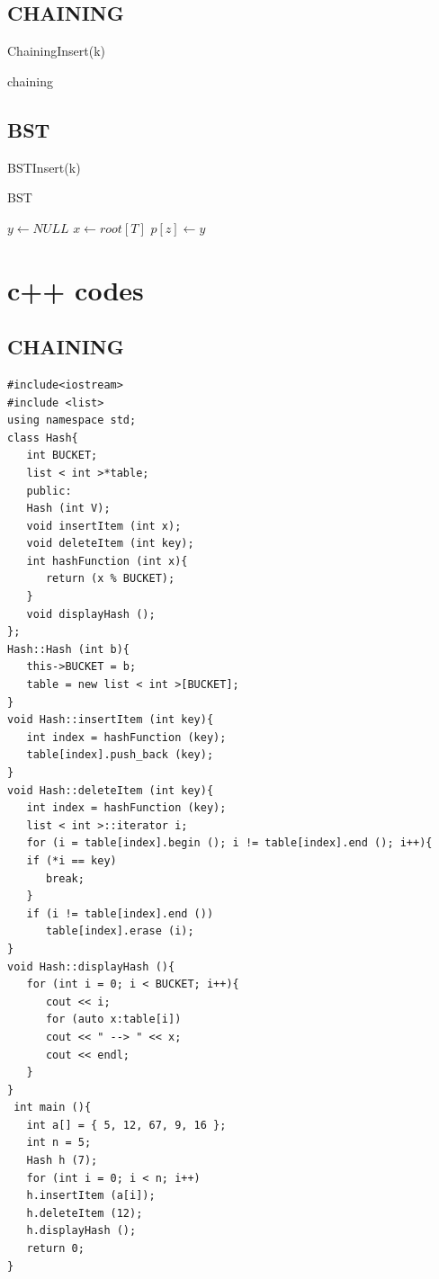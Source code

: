 \documentclass{report}
\begin{document}
\subsection{\textbf{\large CHAINING}}
\begin{algorithm}
ChainingInsert(k)\;
\caption{chaining}\label{alg:two}
\end{algorithm}
\newpage
\subsection{\textbf{\large BST}}
\begin{algorithm}
BSTInsert(k)\;
\caption{BST}\label{alg:three}
$y \gets NULL$\;
$x \gets root[T]$\;
$p[z] \gets y$\;
\end{algorithm}
\newpage
\section{c++ codes}
\subsection{\textbf{\large CHAINING}}
\begin{verbatim}
#include<iostream>
#include <list>
using namespace std;
class Hash{
   int BUCKET;
   list < int >*table;
   public:
   Hash (int V);
   void insertItem (int x);
   void deleteItem (int key);
   int hashFunction (int x){
      return (x % BUCKET);
   }
   void displayHash ();
};
Hash::Hash (int b){
   this->BUCKET = b;
   table = new list < int >[BUCKET];
}
void Hash::insertItem (int key){
   int index = hashFunction (key);
   table[index].push_back (key);
}
void Hash::deleteItem (int key){
   int index = hashFunction (key);
   list < int >::iterator i;
   for (i = table[index].begin (); i != table[index].end (); i++){
   if (*i == key)
      break;
   }
   if (i != table[index].end ())
      table[index].erase (i);
}
void Hash::displayHash (){
   for (int i = 0; i < BUCKET; i++){
      cout << i;
      for (auto x:table[i])
      cout << " --> " << x;
      cout << endl;
   }
}
 int main (){
   int a[] = { 5, 12, 67, 9, 16 };
   int n = 5;
   Hash h (7);
   for (int i = 0; i < n; i++)
   h.insertItem (a[i]);
   h.deleteItem (12);
   h.displayHash ();
   return 0;
}
\end{verbatim}
\end{document}
